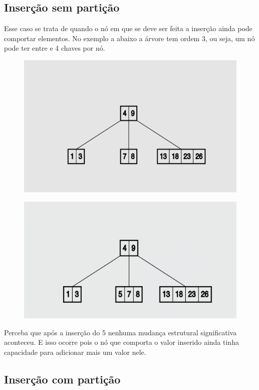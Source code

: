 \subsection*{Inserção sem partição}
Esse caso se trata de quando o nó em que se deve ser feita a inserção ainda pode comportar elementos. No exemplo a abaixo a árvore tem ordem 3, ou seja, um nó pode ter entre e 4 chaves por nó.


\begin{figure}[!ht]
	\centering
	\includegraphics[scale=0.4]{figures/insertion1.png}
\end{figure}

\begin{figure}[!ht]
	\centering
	\includegraphics[scale=0.5]{figures/insertion2.png}
\end{figure}

Perceba que após a inserção do 5 nenhuma mudança estrutural significativa aconteceu. E isso ocorre pois o nó que comporta o valor inserido ainda tinha capacidade para adicionar mais um valor nele.

\subsection*{Inserção com partição}

